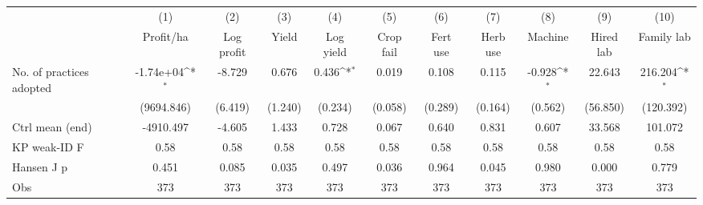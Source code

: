 {
\def\sym#1{\ifmmode^{#1}\else\(^{#1}\)\fi}
\begin{tabular}{l*{10}{c}}
\toprule
                    &\multicolumn{1}{c}{(1)}&\multicolumn{1}{c}{(2)}&\multicolumn{1}{c}{(3)}&\multicolumn{1}{c}{(4)}&\multicolumn{1}{c}{(5)}&\multicolumn{1}{c}{(6)}&\multicolumn{1}{c}{(7)}&\multicolumn{1}{c}{(8)}&\multicolumn{1}{c}{(9)}&\multicolumn{1}{c}{(10)}\\
                    &\multicolumn{1}{c}{Profit/ha}&\multicolumn{1}{c}{Log profit}&\multicolumn{1}{c}{Yield}&\multicolumn{1}{c}{Log yield}&\multicolumn{1}{c}{Crop fail}&\multicolumn{1}{c}{Fert use}&\multicolumn{1}{c}{Herb use}&\multicolumn{1}{c}{Machine}&\multicolumn{1}{c}{Hired lab}&\multicolumn{1}{c}{Family lab}\\
\midrule
No. of practices adopted&   -1.74e+04\sym{*}  &      -8.729         &       0.676         &       0.436\sym{*}  &       0.019         &       0.108         &       0.115         &      -0.928\sym{*}  &      22.643         &     216.204\sym{*}  \\
                    &  (9694.846)         &     (6.419)         &     (1.240)         &     (0.234)         &     (0.058)         &     (0.289)         &     (0.164)         &     (0.562)         &    (56.850)         &   (120.392)         \\
\midrule
Ctrl mean (end)     &   -4910.497         &      -4.605         &       1.433         &       0.728         &       0.067         &       0.640         &       0.831         &       0.607         &      33.568         &     101.072         \\
KP weak-ID F        &        0.58         &        0.58         &        0.58         &        0.58         &        0.58         &        0.58         &        0.58         &        0.58         &        0.58         &        0.58         \\
Hansen J p          &       0.451         &       0.085         &       0.035         &       0.497         &       0.036         &       0.964         &       0.045         &       0.980         &       0.000         &       0.779         \\
Obs                 &         373         &         373         &         373         &         373         &         373         &         373         &         373         &         373         &         373         &         373         \\
\bottomrule
\end{tabular}
}
